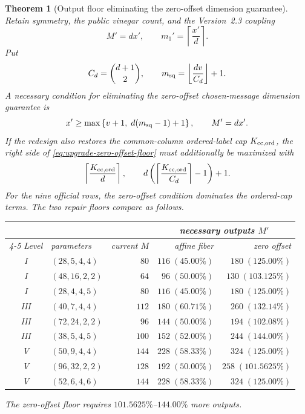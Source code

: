 \documentclass[11pt]{article}
\newtheorem{theorem}{Theorem}[section]
\begin{document}
\begin{theorem}[Output floor eliminating the zero-offset dimension guarantee]
\label{thm:upgrade-zero-offset-floor}
Retain symmetry, the public vinegar count, and the Version~2.3 coupling
\[
 M'=dx',\qquad m_1'=\left\lceil\frac{x'}d\right\rceil.
\]
Put
\[
 C_d=\binom{d+1}{2},
 \qquad
 m_{\rm sq}=\left\lfloor\frac{dv}{C_d}\right\rfloor+1.
\]
A necessary condition for eliminating the zero-offset chosen-message
dimension guarantee is
\begin{equation}
 x'\ge
 \max\left\{v+1,\;d(m_{\rm sq}-1)+1\right\},
 \qquad M'=dx'.                                        \label{eq:upgrade-zero-offset-floor}
\end{equation}
If the redesign also restores the common-column ordered-label cap
$K_{\rm cc,ord}$, the
right side of \eqref{eq:upgrade-zero-offset-floor} must additionally be
maximized with
\[
  \left\lceil\frac{K_{\rm cc,ord}}d\right\rceil,
 \qquad
  d\left(\left\lceil\frac{K_{\rm cc,ord}}{C_d}\right\rceil-1\right)+1.
\]
For the nine official rows, the zero-offset condition dominates the ordered-cap
terms.  The two repair floors compare as follows.
\begin{center}
\small
\begin{tabular}{@{}c l r r r@{}}
\toprule
&&& \multicolumn{2}{c}{necessary outputs $M'$}\\
\cmidrule(l){4-5}
Level & parameters & current $M$ & affine fiber & zero offset\\
\midrule
I   & $(28,5,4,4)$  & $80$  & $116\;(45.00\%)$ & $180\;(125.00\%)$\\
I   & $(48,16,2,2)$ & $64$  & $96\;(50.00\%)$ & $130\;(103.125\%)$\\
I   & $(28,4,4,5)$  & $80$  & $116\;(45.00\%)$ & $180\;(125.00\%)$\\
III & $(40,7,4,4)$  & $112$ & $180\;(60.71\%)$ & $260\;(132.14\%)$\\
III & $(72,24,2,2)$ & $96$  & $144\;(50.00\%)$ & $194\;(102.08\%)$\\
III & $(38,5,4,5)$  & $100$ & $152\;(52.00\%)$ & $244\;(144.00\%)$\\
V   & $(50,9,4,4)$  & $144$ & $228\;(58.33\%)$ & $324\;(125.00\%)$\\
V   & $(96,32,2,2)$ & $128$ & $192\;(50.00\%)$ & $258\;(101.5625\%)$\\
V   & $(52,6,4,6)$  & $144$ & $228\;(58.33\%)$ & $324\;(125.00\%)$\\
\bottomrule
\end{tabular}
\end{center}
The zero-offset floor requires $101.5625\%$--$144.00\%$ more outputs.
\end{theorem}
\end{document}
